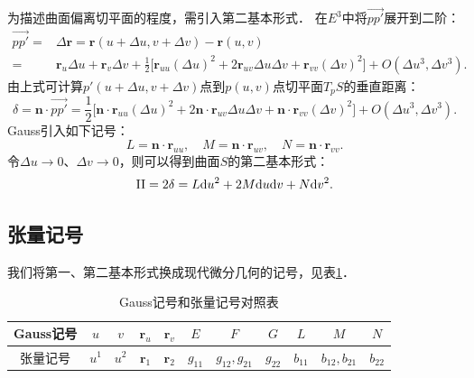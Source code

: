 为描述曲面偏离切平面的程度，需引入第二基本形式．
在$E^3$中将$\overrightarrow{pp'}$展开到二阶：
\begin{align*}
    \overrightarrow{pp'}=&\Delta \boldsymbol{r} =\boldsymbol{r}(u+\Delta u, v+\Delta v) - \boldsymbol{r}(u,v) \\
    =& \boldsymbol{r}_u \Delta u + \boldsymbol{r}_v \Delta v + \frac{1}{2}\bigl[
    \boldsymbol{r}_{uu} (\Delta u)^2 +2\boldsymbol{r}_{uv} \Delta u \Delta v +\boldsymbol{r}_{vv} (\Delta v)^2 \bigr]
    + O(\Delta u^3, \Delta v^3).
\end{align*}
由上式可计算$p'(u+\Delta u, v+\Delta v)$点到$p(u,v)$点切平面$T_pS$的垂直距离：
\begin{equation*}
    \delta = \boldsymbol{n}\cdot \overrightarrow{pp'} = \frac{1}{2}\bigl[
    \boldsymbol{n}\cdot\boldsymbol{r}_{uu} (\Delta u)^2 +2\boldsymbol{n}\cdot\boldsymbol{r}_{uv} \Delta u \Delta v
     +\boldsymbol{n}\cdot\boldsymbol{r}_{vv} (\Delta v)^2 \bigr] + O(\Delta u^3, \Delta v^3).
\end{equation*}
Gauss引入如下记号：
\begin{equation}
    L= \boldsymbol{n}\cdot\boldsymbol{r}_{uu},\quad M= \boldsymbol{n}\cdot\boldsymbol{r}_{uv},
    \quad N=\boldsymbol{n}\cdot\boldsymbol{r}_{vv} .
\end{equation}
令$\Delta u\to 0$、$\Delta v\to 0$，则可以得到曲面$S$的{\heiti 第二基本形式}：
\begin{equation}\label{chcdg:eqn_IIform}
    {\rm II}=2\delta = L {\rm d}u^2 + 2M {\rm d}u {\rm d}v + N {\rm d}v^2 .
\end{equation}

\subsection{张量记号}
我们将第一、第二基本形式换成现代微分几何的记号，见表\ref{chcdg:tab-gauss-tensor}．

\begin{table}[htb]
    \centering
    \caption{Gauss记号和张量记号对照表} \label{chcdg:tab-gauss-tensor}
    \begin{tabular}{|*{11}{c|}}
        \hline 
        Gauss记号 & $u$   &  $v$  & $\boldsymbol{r}_u$  & $\boldsymbol{r}_v$ & $E$ & $F$ & $G$ & $L$ & $M$ & $N$ \\
        \hline
        张量记号  & $u^1$ & $u^2$ & $\boldsymbol{r}_1$ & $\boldsymbol{r}_2$ & $g_{11}$ & $g_{12},g_{21}$ & $g_{22}$ 
         & $b_{11}$ & $b_{12},b_{21}$ & $b_{22}$     \\ 
        \hline
    \end{tabular}
\end{table}

